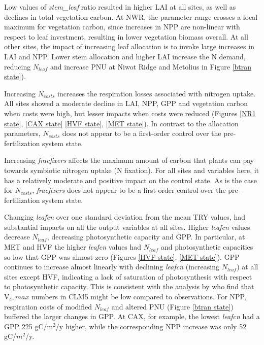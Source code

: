 \usepackage{}\documentclass[draft,linenumbers]{agujournal}
\begin{document}
Low values of \emph{stem\_leaf} ratio resulted in higher LAI at all sites, as well as declines in total vegetation carbon. At NWR, the parameter range crosses a local maximum for vegetation carbon, since increases in NPP are non-linear with respect to leaf investment, resulting in lower vegetation biomass overall. At all other sites, the impact of increasing leaf allocation is to invoke large increases in LAI and NPP. Lower stem allocation and higher LAI increase the N demand, reducing $N_{leaf}$ and increase PNU at Niwot Ridge and Metolius in Figure \ref{btran state}). 

Increasing $N_{costs}$ increases the respiration losses associated with nitrogen uptake.  All sites showed a moderate decline in LAI, NPP, GPP and vegetation carbon when costs were high, but lesser impacts when costs were reduced (Figures \ref{NR1 state}, \ref{CAX state} \ref{HVF state}, \ref{MET state}). In contrast to the allocation parameters, $N_{costs}$ does not appear to be a first-order control over the pre-fertilization system state. 

Increasing \emph{fracfixers} affects the maximum amount of carbon that plants can pay towards symbiotic nitrogen uptake (N fixation). For all sites and variables here, it has a relatively moderate and positive impact on the control state. As is the case for $N_{costs}$, \emph{fracfixers} does not appear to be a first-order control over the pre-fertilization system state.

Changing \emph{leafcn} over one standard deviation from the mean TRY values, had substantial impacts on all the output variables at all sites. Higher \emph{leafcn} values decrease $N_{leaf}$, decreasing photosynthetic capacity and GPP.  In particular, at MET and HVF the higher \emph{leafcn} values had $N_{leaf}$ and photosynthetic capacities so low that GPP was almost zero (Figures \ref{HVF state}, \ref{MET state}).  GPP continues to increase almost linearly with declining \emph{leafcn}  (increasing $N_{leaf}$) at all sites except HVF, indicating a lack of saturation of photosynthesis with respect to photosynthetic capacity.  This is consistent with the analysis by \cite{lawrence2018} who find that V${_c,max}$ numbers in CLM5 might be low compared to observations.  For NPP, respiration costs of modified $N_{leaf}$ and altered PNU (Figure \ref{btran state}) buffered the larger changes in GPP. At CAX, for example, the lowest \emph{leafcn} had a GPP 225 gC/m$^{2}$/y higher, while the corresponding NPP increase was only 52 gC/$m^{2}$/y.
\end{document}
